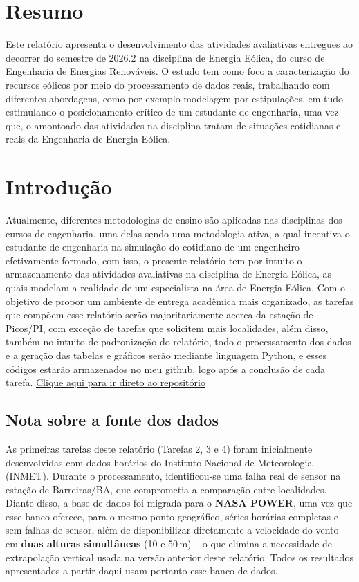 \documentclass[11pt,a4paper]{article}
\begin{document}
\section{Resumo}
Este relatório apresenta o desenvolvimento das atividades avaliativas entregues ao decorrer do semestre de 2026.2 na disciplina de Energia Eólica, do curso de Engenharia de Energias Renováveis. O estudo tem como foco a caracterização do recursos eólicos por meio do processamento de dados reais, trabalhando com diferentes abordagens, como por exemplo modelagem por estipulações, em tudo estimulando o posicionamento crítico de um estudante de engenharia, uma vez que, o amontoado das atividades na disciplina tratam de situações cotidianas e reais da Engenharia de Energia Eólica.

\section{Introdução}
Atualmente, diferentes metodologias de ensino são aplicadas nas disciplinas dos cursos de engenharia, uma delas sendo uma metodologia ativa, a qual incentiva o estudante de engenharia na simulação do cotidiano de um engenheiro efetivamente formado, com isso, o presente relatório tem por intuito o armazenamento das atividades avaliativas na disciplina de Energia Eólica, as quais modelam a realidade de um especialista na área de Energia Eólica.
Com o objetivo de propor um ambiente de entrega acadêmica mais organizado, as tarefas que compõem esse relatório serão majoritariamente acerca da estação de Picos/PI, com exceção de tarefas que solicitem mais localidades, além disso, também no intuito de padronização do relatório, todo o processamento dos dados e a geração das tabelas e gráficos serão mediante linguagem Python, e esses códigos estarão armazenados no meu github, logo após a conclusão de cada tarefa.
\href{[https://github.com/laizaerochar/disciplina-energia-eolica](https://github.com/laizaerochar/disciplina-energia-eolica)}{Clique aqui para ir direto ao repositório}
\subsection*{Nota sobre a fonte dos dados}
As primeiras tarefas deste relatório (Tarefas 2, 3 e 4) foram inicialmente desenvolvidas com dados horários do Instituto Nacional de Meteorologia (INMET). Durante o processamento, identificou-se uma falha real de sensor na estação de Barreiras/BA, que comprometia a comparação entre localidades. Diante disso, a base de dados foi migrada para o \textbf{NASA POWER}, uma vez que esse banco oferece, para o mesmo ponto geográfico, séries horárias completas e sem falhas de sensor, além de disponibilizar diretamente a velocidade do vento em \textbf{duas alturas simultâneas} (10 e 50\,m) -- o que elimina a necessidade de extrapolação vertical usada na versão anterior deste relatório. Todos os resultados apresentados a partir daqui usam portanto esse banco de dados.
\end{document}
